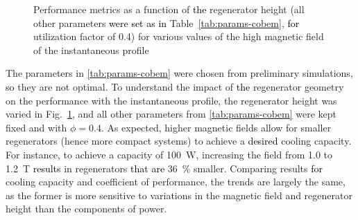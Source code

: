\documentclass[referee]{svjour3}
\begin{document}
\begin{figure}[!ht]
  \centering
\quad
  \caption{Performance metrics as a function of \textcolor{black}{the} regenerator height (all other parameters \textcolor{black}{were set as in} Table~\ref{tab:params-cobem}, \textcolor{black}{for}  utilization factor of 0.4) for various values of the high magnetic field of the instantaneous profile}
\label{fig:Qc_H_inst}
\end{figure}

The parameters in \autoref{tab:params-cobem} were chosen from preliminary simulations, \textcolor{black}{so} they are not  optimal. To understand the impact of \textcolor{black}{the} regenerator geometry on the performance with the instantaneous profile, the regenerator height was varied in Fig.~\ref{fig:Qc_H_inst}, and all other parameters from \autoref{tab:params-cobem} were kept fixed and with $\phi=0.4$. As expected, higher magnetic fields allow for smaller regenerators (hence more compact systems) to achieve a \textcolor{black}{desired} cooling capacity. For instance, to achieve a capacity of \SI{100}{\watt}, increasing the field from \num{1.0} to \SI{1.2}{\tesla} \textcolor{black}{results} in regenerators \textcolor{black}{that are} \SI{36}{\percent} smaller. Comparing results \textcolor{black}{for} cooling capacity and coefficient of performance, the trends are largely the same, as the former is more sensitive to variations in the magnetic field and regenerator height than the components of power.
\end{document}
